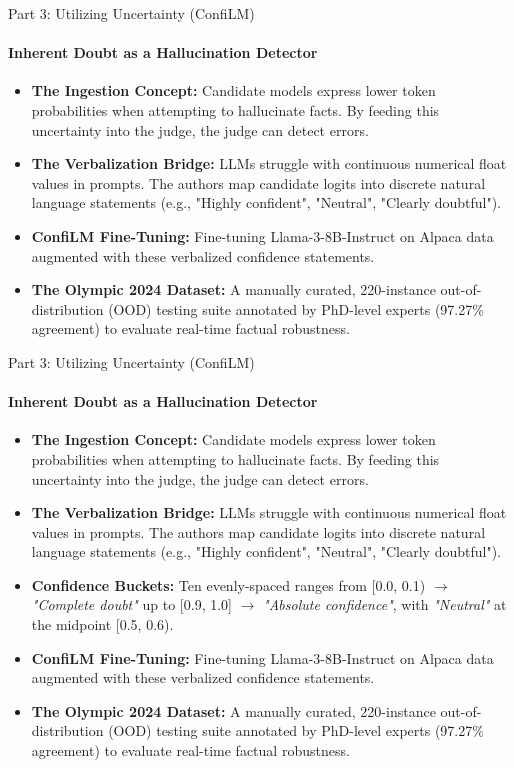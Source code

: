 \documentclass[10pt]{beamer}
\begin{document}
	\begin{frame}{Part 3: Utilizing Uncertainty (ConfiLM)}
		\framesubtitle{Inherent Doubt as a Hallucination Detector}
		\begin{itemize}
			\item \textbf{The Ingestion Concept:} Candidate models express lower token probabilities when attempting to hallucinate facts. By feeding this uncertainty into the judge, the judge can detect errors.
			\item \textbf{The Verbalization Bridge:} LLMs struggle with continuous numerical float values in prompts. The authors map candidate logits into discrete natural language statements (e.g., "Highly confident", "Neutral", "Clearly doubtful").
			\item \textbf{ConfiLM Fine-Tuning:} Fine-tuning Llama-3-8B-Instruct on Alpaca data augmented with these verbalized confidence statements.
			\item \textbf{The Olympic 2024 Dataset:} A manually curated, 220-instance out-of-distribution (OOD) testing suite annotated by PhD-level experts (97.27\% agreement) to evaluate real-time factual robustness.
		\end{itemize}
	\end{frame}
	
	\begin{frame}{Part 3: Utilizing Uncertainty (ConfiLM)}
		\framesubtitle{Inherent Doubt as a Hallucination Detector}
		\begin{itemize}
			\item \textbf{The Ingestion Concept:} Candidate models express lower token probabilities when attempting to hallucinate facts. By feeding this uncertainty into the judge, the judge can detect errors.
			\item \textbf{The Verbalization Bridge:} LLMs struggle with continuous numerical float values in prompts. The authors map candidate logits into discrete natural language statements (e.g., "Highly confident", "Neutral", "Clearly doubtful").
			\item \textbf{Confidence Buckets:} Ten evenly-spaced ranges from [0.0, 0.1) $\rightarrow$ \textit{"Complete doubt"} up to [0.9, 1.0] $\rightarrow$ \textit{"Absolute confidence"}, with \textit{"Neutral"} at the midpoint [0.5, 0.6).
			\item \textbf{ConfiLM Fine-Tuning:} Fine-tuning Llama-3-8B-Instruct on Alpaca data augmented with these verbalized confidence statements.
			\item \textbf{The Olympic 2024 Dataset:} A manually curated, 220-instance out-of-distribution (OOD) testing suite annotated by PhD-level experts (97.27\% agreement) to evaluate real-time factual robustness.
		\end{itemize}
	\end{frame}
	
\end{document}
